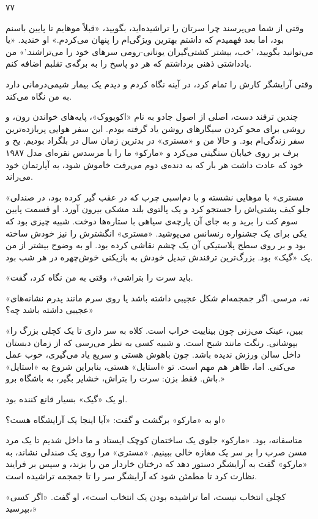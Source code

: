 ۷۷

وقتی از شما می‌پرسند چرا سرتان را تراشیده‌اید، بگویید، «قبلاً موهایم تا پایین باسنم بود، اما بعد فهمیدم که داشتم بهترین ویژگی‌ام را پنهان می‌کردم.» او خندید. «یا می‌توانید بگویید، 'خب، بیشتر کشتی‌گیران یونانی-رومی سرهای خود را می‌تراشند.'» من یادداشتی ذهنی برداشتم که هر دو پاسخ را به برگه‌ی تقلبم اضافه کنم.

وقتی آرایشگر کارش را تمام کرد، در آینه نگاه کردم و دیدم یک بیمار شیمی‌درمانی دارد به من نگاه می‌کند.

چندین ترفند دست، اصلی از اصول جادو به نام «اکویووک»، پایه‌های خواندن رون، و روشی برای محو کردن سیگارهای روشن یاد گرفته بودم. این سفر هوایی پربازده‌ترین سفر زندگی‌ام بود. و حالا من و «مستری» در بدترین زمان سال در بلگراد بودیم. یخ و برف بر روی خیابان سنگینی می‌کرد و «مارکو» ما را با مرسدس نقره‌ای مدل ۱۹۸۷ خود که عادت داشت هر بار که به دنده‌ی دوم می‌رفت خاموش شود، به آپارتمان خود می‌راند.

«مستری» با موهایی نشسته و با دم‌اسبی چرب که در عقب گیر کرده بود، در صندلی جلو کیف پشتی‌اش را جستجو کرد و یک پالتوی بلند مشکی بیرون آورد. او قسمت پایین سوم کت را برید و به جای آن پارچه‌ی سیاهی با ستاره‌ها دوخت. شبیه چیزی بود که یکی برای یک جشنواره رنسانس می‌پوشید. «مستری» انگشترش را نیز خودش ساخته بود و بر روی سطح پلاستیکی آن یک چشم نقاشی کرده بود. او به وضوح بیشتر از من یک «گیک» بود. بزرگ‌ترین ترفندش تبدیل خودش به بازیکنی خوش‌چهره در هر شب بود.

«باید سرت را بتراشی»، وقتی به من نگاه کرد، گفت.

«نه، مرسی. اگر جمجمه‌ام شکل عجیبی داشته باشد یا روی سرم مانند پدرم نشانه‌های عجیبی داشته باشد چه؟»

«ببین، عینک می‌زنی چون بیناییت خراب است. کلاه به سر داری تا یک کچلی بزرگ را بپوشانی. رنگت مانند شبح است. و شبیه کسی به نظر می‌رسی که از زمان دبستان داخل سالن ورزش ندیده باشد. چون باهوش هستی و سریع یاد می‌گیری، خوب عمل می‌کنی. اما، ظاهر هم مهم است. تو «استایل» هستی، بنابراین شروع به «استایل» باش. فقط بزن: سرت را بتراش، خشایر بگیر، به باشگاه برو.»

او یک «گیک» بسیار قانع کننده بود.

او به «مارکو» برگشت و گفت: «آیا اینجا یک آرایشگاه هست؟»

متاسفانه، بود. «مارکو» جلوی یک ساختمان کوچک ایستاد و ما داخل شدیم تا یک مرد مسن صرب را بر سر یک مغازه خالی ببینیم. «مستری» مرا روی یک صندلی نشاند، به «مارکو» گفت به آرایشگر دستور دهد که درختان خاردار من را بزند، و سپس بر فرایند نظارت کرد تا مطمئن شود که آرایشگر سر را تا جمجمه تراشیده است.

«کچلی انتخاب نیست، اما تراشیده بودن یک انتخاب است»، او گفت. «اگر کسی بپرسید،»

